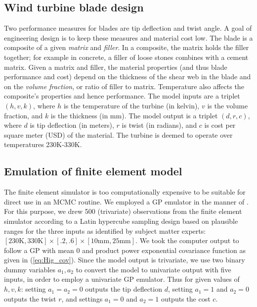 \documentclass[12pt]{article}
\begin{document}
\subsection{Wind turbine blade design}

Two performance measures for blades are tip deflection and twist angle.
%
A goal of engineering design is to keep these measures and material cost low.
%
The blade is a composite of a given \emph{matrix} and \emph{filler}.
%
In a composite, the matrix holds the filler together; for example in concrete, a filler of loose stones combines with a cement matrix.
%
Given a matrix and filler, the material properties (and thus blade performance and cost) depend on the thickness of the shear web in the blade and on the \emph{volume fraction}, or ratio of filler to matrix.
%
%
Temperature also affects the composite's properties and hence performance.
%
The model inputs are a triplet $(h,v,k)$, where $h$ is the temperature of the turbine (in kelvin), $v$ is the volume fraction, and $k$ is the thickness (in mm).
%
The model output is a triplet $(d,r,c)$, where $d$ is tip deflection (in meters), $r$ is twist (in radians), and $c$ is cost per square meter (USD) of the material.
%
The turbine is deemed to operate over temperatures 230K-330K.
%

\subsection{Emulation of finite element model}\label{emulator} %
The finite element simulator is too computationally expensive to be suitable for direct use in an MCMC routine.
%
We employed a GP emulator in the manner of \cite{Williams2006}.
%
For this purpose, we drew 500 (trivariate) observations from the finite element simulator according to a Latin hypercube sampling design \citep{McKay1979} based on plausible ranges for the three inputs as identified by subject matter experts: $[230\mathrm{K}, 330\mathrm{K}] \times [.2,.6]\times[10\mathrm{mm},25\mathrm{mm}]$.
%
We took the computer output to follow a GP with mean 0 and product power exponential covariance function as given in (\ref{eq:Hig_cov}).
%
Since the model output is trivariate, we use two binary dummy variables $a_1,a_2$ to convert the model to univariate output with five inputs, in order to employ a univariate GP emulator.
%
Thus for given values of $h,v,k$: setting $a_1=a_2=0$ outputs the tip deflection $d$, setting $a_1=1$ and $a_2=0$ outputs the twist $r$, and settings $a_1=0$ and $a_2=1$ outputs the cost $c$.
\end{document}
